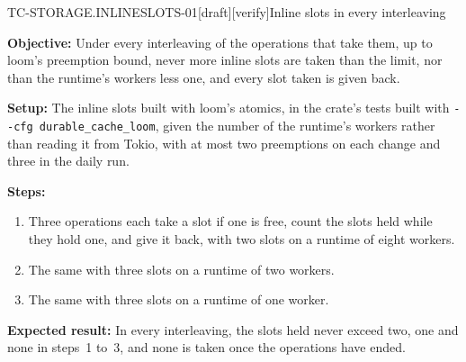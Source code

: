 \begin{requirement}{TC-STORAGE.INLINESLOTS-01}[draft][verify]{Inline slots in every interleaving}


  \textbf{Objective:} Under every interleaving of the operations that take
  them, up to loom's preemption bound, never more inline slots are taken
  than the limit, nor than the runtime's workers less one, and every slot
  taken is given back.

  \textbf{Setup:} The inline slots built with loom's atomics, in the crate's
  tests built with \texttt{-{}-cfg durable\_cache\_loom}, given the number of
  the runtime's workers rather than reading it from Tokio, with at most two
  preemptions on each change and three in the daily run.

  \textbf{Steps:}
  \begin{enumerate}
    \item Three operations each take a slot if one is free, count the slots
      held while they hold one, and give it back, with two slots on a runtime
      of eight workers.
    \item The same with three slots on a runtime of two workers.
    \item The same with three slots on a runtime of one worker.
  \end{enumerate}

  \textbf{Expected result:} In every interleaving, the slots held never
  exceed two, one and none in steps~1 to~3, and none is taken once the
  operations have ended.



\end{requirement}


